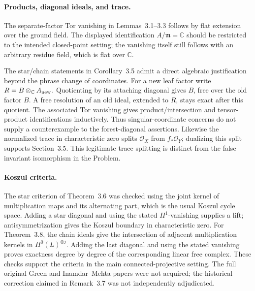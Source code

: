 \documentclass[10pt]{article}
\begin{document}
\paragraph*{Products, diagonal ideals, and trace.}\mbox{}\par
The separate-factor Tor vanishing in Lemmas 3.1–3.3 follows by flat extension over the ground field. The displayed identification \(A/\mathfrak m=\mathbb C\) should be restricted to the intended closed-point setting; the vanishing itself still follows with an arbitrary residue field, which is flat over \(\mathbb C\).\par
The star/chain statements in Corollary 3.5 admit a direct algebraic justification beyond the phrase change of coordinates. For a new leaf factor write \(R=B\otimes_\mathbb CA_{\rm new}\). Quotienting by its attaching diagonal gives \(B\), free over the old factor \(B\). A free resolution of an old ideal, extended to \(R\), stays exact after this quotient. The associated Tor vanishing gives product/intersection and tensor-product identifications inductively. Thus singular-coordinate concerns do not supply a counterexample to the forest-diagonal assertions. Likewise the normalized trace in characteristic zero splits \(\mathcal O_X\) from \(f_*\mathcal O_Y\); dualizing this split supports Section 3.5. This legitimate trace splitting is distinct from the false invariant isomorphism in the Problem.\par
\paragraph*{Koszul criteria.}\mbox{}\par
The star criterion of Theorem 3.6 was checked using the joint kernel of multiplication maps and its alternating part, which is the usual Koszul cycle space. Adding a star diagonal and using the stated \(H^1\)-vanishing supplies a lift; antisymmetrization gives the Koszul boundary in characteristic zero. For Theorem 3.8, the chain ideals give the intersection of adjacent multiplication kernels in \(H^0(L)^{\otimes j}\). Adding the last diagonal and using the stated vanishing proves exactness degree by degree of the corresponding linear free complex. These checks support the criteria in the main connected-projective setting. The full original Green and Inamdar–Mehta papers were not acquired; the historical correction claimed in Remark 3.7 was not independently adjudicated.\par
\end{document}
